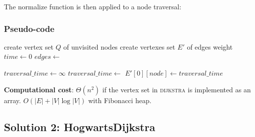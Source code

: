 \documentclass{article}
\begin{document}
The normalize function is then applied to a node traversal:

\subsubsection{Pseudo-code}

\begin{algorithmic}[1]
  \State create vertex set $Q$ of unvisited nodes\;
  \State create vertexes set $E'$ of edges weight\;
  \State $time \gets 0$                   
  \State $edges \gets$ \;      
      \State \Return{}
    \EndIf

    \State $traversal\_time \gets \infty$
      \State $traversal\_time \gets$ 
      \State $E'[0][node] \gets traversal\_time$   
      \State {}

        \State {}
      \EndFor
    \EndFor
    	\State {}
    \Else
      \State {}
    \EndIf
  \EndFunction
\end{algorithmic}

\begin{framed}
  \noindent
  \textbf{Computational cost}: $\Theta(n^{2})$ if the vertex set in \textsc{dijkstra} is implemented
  as an array. $O(|E|+|V|\log |V|)$ with Fibonacci heap.
\end{framed}

\subsection{Solution 2: HogwartsDijkstra}
\end{document}
